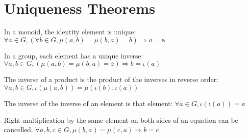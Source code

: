 \section{Uniqueness Theorems}

\begin{theorem}
    \label{theorem : id_unique}
    \leanok
    In a monoid, the identity element is unique:
    $\forall a \in G, (\forall b \in G, \mu(a, b) = \mu(b, a) = b) \Rightarrow a = \mathbb{e}$
  \end{theorem}

\begin{theorem}
    \label{theorem : inv_unique}
    \leanok
    In a group, each element has a unique inverse:
    $\forall a, b \in G, (\mu(a, b) = \mu(b, a) = \mathbb{e}) \Rightarrow b = \iota(a)$
  \end{theorem}

\begin{theorem}
  \label{theorem : inv_anticomm}
  \leanok
  The inverse of a product is the product of the inverses in reverse order:
  $\forall a, b \in G, \iota(\mu(a, b)) = \mu(\iota(b), \iota(a))$
\end{theorem}

\begin{theorem}
  \label{theorem : inv_inv}
  \leanok
  The inverse of the inverse of an element is that element:
  $\forall a \in G, \iota(\iota(a)) = a$
\end{theorem}

\begin{theorem}
  \label{definition : right_cancel}
  \leanok
  Right-multiplication by the same element on both sides of an equation can be cancelled.
  $\forall a, b, c \in G, \mu(b, a) = \mu(c, a) \Rightarrow b = c$
\end{theorem}
